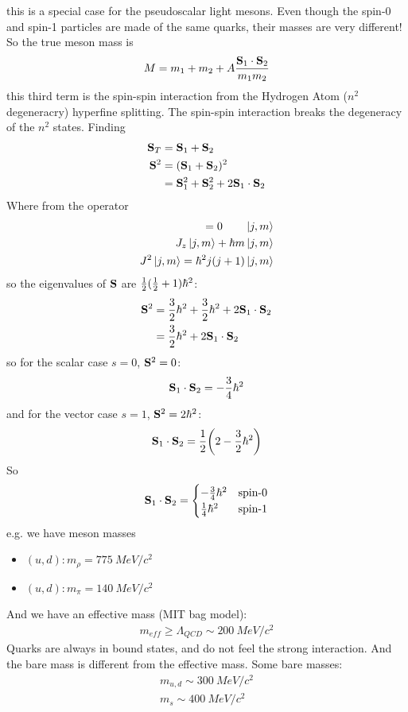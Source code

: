 \documentclass[../main.tex]{subfiles}
\begin{document}
this is a special case for the pseudoscalar light mesons. Even though the spin-0 and spin-1
particles are made of the same quarks, their masses are very different! So the true meson mass is
\begin{align*}
    M = m_1 + m_2 + A \frac{\vb S_1 \cdot \vb S_2}{m_1 m_2}
\end{align*}
this third term is the spin-spin interaction from the Hydrogen Atom ($n^2$ degeneracry) 
hyperfine splitting. The spin-spin interaction breaks the degeneracy of the $n^2$ states. Finding
\begin{align*}
    \vb S_T &= \vb S_1 + \vb S_2 \\
    \vb S^2 &= (\vb S_1 + \vb S_2)^2 \\
    &= \vb S_1^2 + \vb S_2^2 + 2\vb S_1 \cdot \vb S_2
\end{align*}
Where from the operator
\begin{align*}
    [J^2, J_z] = 0 \qquad \ket{j, m} \\
    J_z \ket{j,m} + \hbar m \ket{j,m} \\
    J^2 \ket{j,m} = \hbar^2 j(j+1) \ket{j,m}
\end{align*}
so the eigenvalues of $\vb S$ are $\frac{1}{2}(\frac{1}{2} + 1)\hbar^2$:
\begin{align*}
    \vb S^2 &= \frac{3}{2} \hbar^2 + \frac{3}{2} \hbar^2 + 2\vb S_1 \cdot \vb S_2 \\
    &= \frac{3}{2}\hbar^2 + 2\vb S_1 \cdot \vb S_2
\end{align*}
so for the scalar case $s =0$, $\vb S^2 = 0$:
\begin{align*}
    \vb S_1 \cdot \vb S_2 = -\frac{3}{4}\hbar^2
\end{align*}
and for the vector case $s = 1$, $\vb S^2 = 2\hbar^2$:
\begin{align*}
    \vb S_1 \cdot \vb S_2 = \ohf \qt(2 - \thf \hbar^2)
\end{align*}
So
\begin{align*}
    \vb S_1 \cdot \vb S_2 = \begin{cases}
        -\frac{3}{4}\hbar^2 & \text{spin-0} \\
        \frac{1}{4} \hbar^2 & \text{spin-1}
    \end{cases}
\end{align*}
e.g. we have meson masses
\begin{itemize}
    \item $(u,d): m_\rho = \qty{775}{MeV/c^2}$
    \item $(u,d): m_\pi = \qty{140}{MeV/c^2}$
\end{itemize}
And we have an effective mass (MIT bag model):
\begin{align*}
    m_{eff} \geq \Lambda_{QCD} \sim \qty{200}{MeV/c^2}
\end{align*}
Quarks are always in bound states, and do not feel the strong interaction. And the bare mass is 
different from the effective mass. Some bare masses:
\begin{align*}
    m_{u,d} \sim \qty{300}{MeV/c^2} \\
    m_s \sim \qty{400}{MeV/c^2}
\end{align*}
\end{document}
